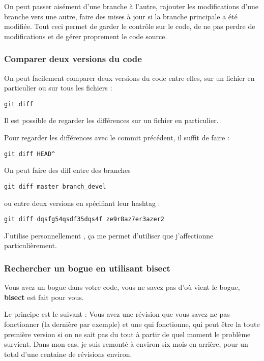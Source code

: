 \bigskip

On peut passer aisément d'une branche à l'autre, rajouter les modifications d'une branche vers une autre, faire des mises à jour si la branche principale a été modifiée. Tout ceci permet de garder le contrôle sur le code, de ne pas perdre de modifications et de gérer proprement le code source. 

\subsubsection{Comparer deux versions du code}
On peut facilement comparer deux versions du code entre elles, sur un fichier en particulier ou sur tous les fichiers : 
\begin{verbatim}
git diff
\end{verbatim}

\begin{remarque}
Il est possible de regarder les différences sur un fichier en particulier.
\end{remarque}

Pour regarder les différences avec le commit précédent, il suffit de faire :
\begin{verbatim}
git diff HEAD^
\end{verbatim}

\bigskip

On peut faire des diff entre des branches 
\begin{verbatim}
git diff master branch_devel
\end{verbatim}
ou entre deux versions en spécifiant leur hashtag : 
\begin{verbatim}
git diff dqsfg54qsdf35dqs4f ze9r8az7er3azer2
\end{verbatim}

J'utilise personnellement , ça me permet d'utiliser  que j'affectionne particulièrement.

\subsubsection{Rechercher un bogue en utilisant bisect}
Vous avez un bogue dans votre code, vous ne savez pas d'où vient le bogue, \textbf{bisect} est fait pour vous. 

Le principe est le suivant : Vous avez une révision que vous savez ne pas fonctionner (la dernière par exemple) et une qui
fonctionne, qui peut être la toute première version si on ne sait pas du tout à partir de quel moment le problème survient.
Dans mon cas, je suis remonté à environ six mois en arrière, pour un total d'une centaine de révisions environ. 

